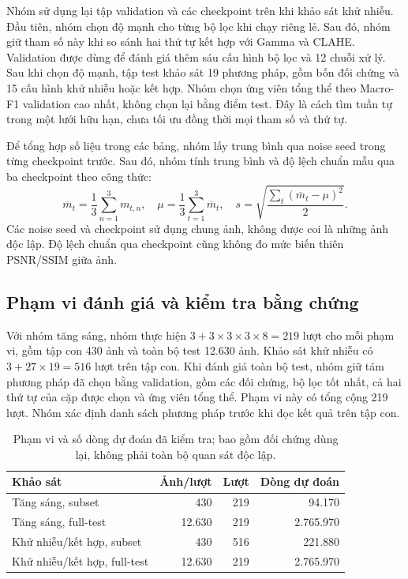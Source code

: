 Nhóm sử dụng lại tập validation và các checkpoint trên khi khảo sát khử nhiễu. Đầu tiên, nhóm chọn độ mạnh cho từng bộ lọc khi chạy riêng lẻ. Sau đó, nhóm giữ tham số này khi so sánh hai thứ tự kết hợp với Gamma và CLAHE. Validation được dùng để đánh giá thêm sáu cấu hình bộ lọc và 12 chuỗi xử lý. Sau khi chọn độ mạnh, tập test khảo sát 19 phương pháp, gồm bốn đối chứng và 15 cấu hình khử nhiễu hoặc kết hợp. Nhóm chọn ứng viên tổng thể theo Macro-F1 validation cao nhất, không chọn lại bằng điểm test. Đây là cách tìm tuần tự trong một lưới hữu hạn, chưa tối ưu đồng thời mọi tham số và thứ tự.

Để tổng hợp số liệu trong các bảng, nhóm lấy trung bình qua noise seed trong từng checkpoint trước. Sau đó, nhóm tính trung bình và độ lệch chuẩn mẫu qua ba checkpoint theo công thức:
\begin{equation}
\overline m_t=\frac{1}{3}\sum_{n=1}^{3}m_{t,n},\quad
\mu=\frac{1}{3}\sum_{t=1}^{3}\overline m_t,\quad
s=\sqrt{\frac{\sum_t(\overline m_t-\mu)^2}{2}}.
\end{equation}
Các noise seed và checkpoint sử dụng chung ảnh, không được coi là những ảnh độc lập. Độ lệch chuẩn qua checkpoint cũng không đo mức biến thiên PSNR/SSIM giữa ảnh.

\subsection{Phạm vi đánh giá và kiểm tra bằng chứng}
Với nhóm tăng sáng, nhóm thực hiện $3+3\times3\times3\times8=219$ lượt cho mỗi phạm vi, gồm tập con 430 ảnh và toàn bộ test 12.630 ảnh. Khảo sát khử nhiễu có $3+27\times19=516$ lượt trên tập con. Khi đánh giá toàn bộ test, nhóm giữ tám phương pháp đã chọn bằng validation, gồm các đối chứng, bộ lọc tốt nhất, cả hai thứ tự của cặp được chọn và ứng viên tổng thể. Phạm vi này có tổng cộng 219 lượt. Nhóm xác định danh sách phương pháp trước khi đọc kết quả trên tập con.
\par
\begin{table}[!htbp]\centering
\caption{Phạm vi và số dòng dự đoán đã kiểm tra; bao gồm đối chứng dùng lại, không phải toàn bộ quan sát độc lập.}
\begin{tabular}{lrrr}\toprule Khảo sát & Ảnh/lượt & Lượt & Dòng dự đoán\\\midrule
Tăng sáng, subset & 430 & 219 & 94.170\\
Tăng sáng, full-test & 12.630 & 219 & 2.765.970\\
Khử nhiễu/kết hợp, subset & 430 & 516 & 221.880\\
Khử nhiễu/kết hợp, full-test & 12.630 & 219 & 2.765.970\\\bottomrule
\end{tabular}\label{tab:coverage}\end{table}\par


